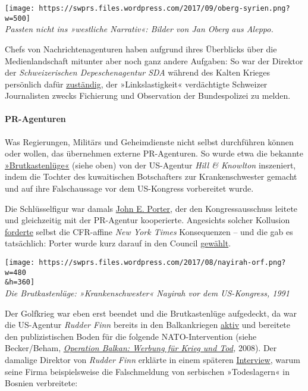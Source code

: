 \texttt{[image: https://swprs.files.wordpress.com/2017/09/oberg-syrien.png?w=500]}\\
\emph{Passten nicht ins »westliche Narrativ«: Bilder von Jan Oberg aus
Aleppo.}

Chefs von Nachrichtenagenturen haben aufgrund ihres Überblicks über die
Medien­land­schaft mitunter aber noch ganz andere Aufgaben: So war der
Direktor der \emph{Schweizerischen Depeschen­agentur SDA} während des
Kalten Krieges persönlich dafür
\href{https://www.infosperber.ch/Medien/Demokratie-Pressevielfalt-Medien}{zuständig},
der »Links­lastigkeit« verdächtigte Schweizer Journalisten zwecks
Fichierung und Observation der Bundes­polizei zu melden.

\hypertarget{pr-agenturen}{%
\paragraph{PR-Agenturen}\label{pr-agenturen}}

Was Regierungen, Militärs und Geheimdienste nicht selbst durchführen
können oder wollen, das übernehmen externe PR-Agenturen. So wurde etwa
die bekannte
\href{https://en.wikipedia.org/wiki/Nayirah_(testimony)}{»Brutkastenlüge«}
(siehe oben) von der US-Agentur \emph{Hill \& Knowlton} inszeniert,
indem die Tochter des kuwaitischen Botschafters zur Kranken­schwester
gemacht und auf ihre Falschaussage vor dem US-Kongress vorbereitet
wurde.

Die Schlüsselfigur war damals
\href{https://en.wikipedia.org/wiki/Nayirah_(testimony)}{John E.
Porter}, der den Kongress­ausschuss leitete und gleichzeitig mit der
PR-Agentur kooperierte. Angesichts solcher Kollusion
\href{https://en.wikipedia.org/wiki/Nayirah_(testimony)\#Revelation}{forderte}
selbst die CFR-affine \emph{New York Times} Konsequenzen -- und die gab
es tatsächlich: Porter wurde kurz darauf in den Council
\href{https://swprs.files.wordpress.com/2017/07/council-on-foreign-relations-membership-rosters-1922-2013.pdf}{gewählt}.

\texttt{[image: https://swprs.files.wordpress.com/2017/08/nayirah-orf.png?w=480\\\&h=360]}\\
\emph{Die Brutkastenlüge: »Krankenschwester« Nayirah vor dem
US-Kongress, 1991}

Der Golfkrieg war eben erst beendet und die Brutkasten­lüge aufgedeckt,
da war die US-Agentur \emph{Rudder Finn} bereits in den Balkan­kriegen
\href{https://www.hintergrund.de/globales/kriege/operation-balkan-werbung-fuer-krieg-und-tod/}{aktiv}
und bereitete den publizistischen Boden für die folgende
NATO-Intervention (siehe Becker/Beham,
\emph{\href{https://www.hintergrund.de/globales/kriege/operation-balkan-werbung-fuer-krieg-und-tod/}{Operation
Balkan: Werbung für Krieg und Tod},} 2008). Der damalige Direktor von
\emph{Rudder Finn} erklärte in einem späteren
\href{http://www.sourcewatch.org/index.php/James_Harff}{Interview},
warum seine Firma beispiels­weise die Falsch­meldung von serbischen
»Todeslagern« in Bosnien verbreitete:


